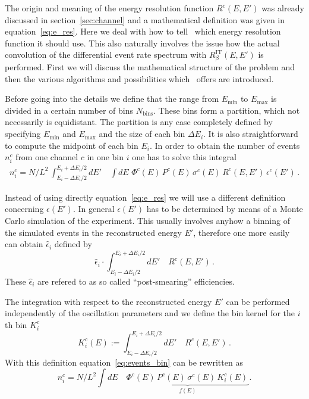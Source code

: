 The origin and meaning of the energy resolution function 
$R^c(E,E')$ was already discussed in 
section~\ref{sec:channel} and  a mathematical definition
was given in equation~\ref{eq:e_res}. Here we deal with
how to tell \GLOBES\ which energy resolution function it should
use. This also naturally involves the issue how the actual convolution
of the differential event rate spectrum with $R_\beta^{\text{IT}}(E,E')$
is performed. First we will discuss the mathematical structure of
the problem and then the various algorithms and possibilities which
\GLOBES\ offers are introduced. 


Before going into the details we define that the range from $E_\mathrm{min}$
to $E_\mathrm{max}$ is divided in a certain number of bins $N_\mathrm{bins}$.
These bins form a partition, which not necessarily is equidistant. The 
partition is any case completely defined by specifying $E_\mathrm{min}$
and $E_\mathrm{max}$ and the size of each bin  $\Delta E_i$. It is also
straightforward to compute the midpoint of each bin $E_i$.
In order to obtain the number of events 
$n_i^c$ from one channel $c$ in one bin $i$ one has to solve this integral
%
\begin{eqnarray}
\label{eq:events_bin}
n_i^c=N/L^2\,\int_{E_i-\Delta E_i/2}^{E_i+\Delta E_i/2} dE' 
\quad \int dE \,\, \Phi^c(E)\,
P^c(E)\,
\sigma^c(E)\,
R^c(E,E')\,
\epsilon^c(E')\,.
\end{eqnarray} 
%

Instead of using directly equation~\ref{eq:e_res} we will use a different
definition concerning $\epsilon(E')$. In general  $\epsilon(E')$ has to be
determined by means of a Monte Carlo simulation of the experiment. This
usually involves anyhow a binning of the simulated events in the reconstructed
energy $E'$, therefore one more easily can obtain  $\hat\epsilon_i$ defined
by
\begin{equation}
\label{eq:post_smearing}
\hat\epsilon_i \cdot \int_{E_i-\Delta E_i/2}^{E_i+\Delta E_i/2} dE' 
\quad R^c(E,E')\,.
\end{equation}
These  $\hat\epsilon_i$ are refered to as so called 
``post-smearing'' efficiencies.

The integration with respect to the reconstructed energy $E'$ can be
performed independently of the oscillation parameters and we define
the bin kernel for the $i$th bin $K_i^c$
\begin{equation}
\label{eq:kernel}
K_i^c(E):=\int_{E_i-\Delta E_i/2}^{E_i+\Delta E_i/2} dE' 
\quad R^c(E,E')\,.
\end{equation}
With this definition equation~\ref{eq:events_bin} can be rewritten as
\begin{equation}
\label{eq:simple_int}
n_i^c=N/L^2 \int dE\quad  \underbrace{\Phi^c(E)\,
P^c(E)\,
\sigma^c(E)\,
K_i^c(E)\,}_{f(E)}. 
\end{equation}

